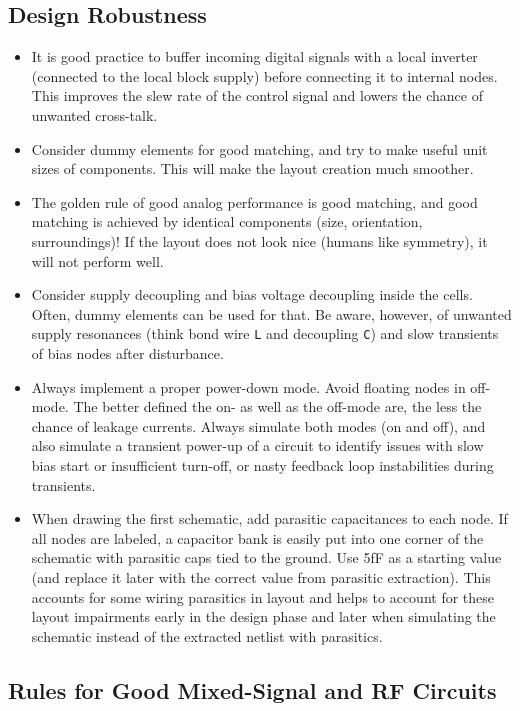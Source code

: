 \documentclass[
  a4paper,
  DIV=11,
  numbers=noendperiod]{scrartcl}
\providecommand{\tightlist}{%
  \setlength{\itemsep}{0pt}\setlength{\parskip}{0pt}}\usepackage{longtable,booktabs,array}
\begin{document}
\subsection{Design Robustness}\label{design-robustness}

\begin{itemize}
\tightlist
\item
  It is good practice to buffer incoming digital signals with a local
  inverter (connected to the local block supply) before connecting it to
  internal nodes. This improves the slew rate of the control signal and
  lowers the chance of unwanted cross-talk.
\item
  Consider dummy elements for good matching, and try to make useful unit
  sizes of components. This will make the layout creation much smoother.
\item
  The golden rule of good analog performance is good matching, and good
  matching is achieved by identical components (size, orientation,
  surroundings)! If the layout does not look nice (humans like
  symmetry), it will not perform well.
\item
  Consider supply decoupling and bias voltage decoupling inside the
  cells. Often, dummy elements can be used for that. Be aware, however,
  of unwanted supply resonances (think bond wire \texttt{L} and
  decoupling \texttt{C}) and slow transients of bias nodes after
  disturbance.
\item
  Always implement a proper power-down mode. Avoid floating nodes in
  off-mode. The better defined the on- as well as the off-mode are, the
  less the chance of leakage currents. Always simulate both modes (on
  and off), and also simulate a transient power-up of a circuit to
  identify issues with slow bias start or insufficient turn-off, or
  nasty feedback loop instabilities during transients.
\item
  When drawing the first schematic, add parasitic capacitances to each
  node. If all nodes are labeled, a capacitor bank is easily put into
  one corner of the schematic with parasitic caps tied to the ground.
  Use 5fF as a starting value (and replace it later with the correct
  value from parasitic extraction). This accounts for some wiring
  parasitics in layout and helps to account for these layout impairments
  early in the design phase and later when simulating the schematic
  instead of the extracted netlist with parasitics.
\end{itemize}

\subsection{Rules for Good Mixed-Signal and RF
Circuits}\label{rules-for-good-mixed-signal-and-rf-circuits}
\end{document}
